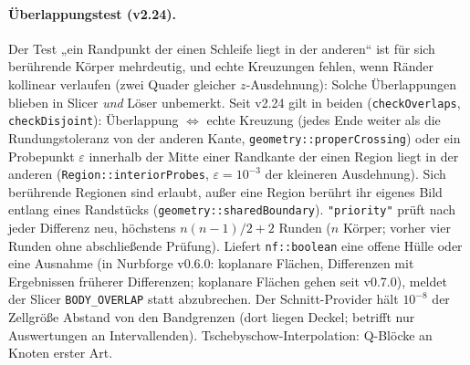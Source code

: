 \paragraph{Überlappungstest (v2.24).} Der Test „ein Randpunkt der einen Schleife liegt in der anderen“ ist für sich
berührende Körper mehrdeutig, und echte Kreuzungen fehlen, wenn Ränder kollinear verlaufen (zwei Quader gleicher
$z$-Ausdehnung): Solche Überlappungen blieben in Slicer \emph{und} Löser unbemerkt. Seit v2.24 gilt in beiden
(\verb|checkOverlaps|, \verb|checkDisjoint|): Überlappung $\Leftrightarrow$ echte Kreuzung (jedes Ende weiter als die
Rundungstoleranz von der anderen Kante, \verb|geometry::properCrossing|) oder ein Probepunkt $\varepsilon$ innerhalb
der Mitte einer Randkante der einen Region liegt in der anderen (\verb|Region::interiorProbes|, $\varepsilon=10^{-3}$
der kleineren Ausdehnung). Sich berührende Regionen sind erlaubt, außer eine Region berührt ihr eigenes Bild entlang
eines Randstücks (\verb|geometry::sharedBoundary|). \verb|"priority"| prüft nach jeder Differenz neu, höchstens
$n(n-1)/2+2$ Runden ($n$ Körper; vorher vier Runden ohne abschließende Prüfung). Liefert \verb|nf::boolean| eine
offene Hülle oder eine Ausnahme (in Nurbforge v0.6.0: koplanare Flächen, Differenzen mit Ergebnissen früherer
Differenzen; koplanare Flächen gehen seit v0.7.0), meldet der Slicer \verb|BODY_OVERLAP| statt abzubrechen. Der Schnitt-Provider hält $10^{-8}$ der Zellgröße Abstand von den Bandgrenzen (dort liegen Deckel;
betrifft nur Auswertungen an Intervallenden). Tschebyschow-Interpolation: Q-Blöcke an Knoten erster Art.


